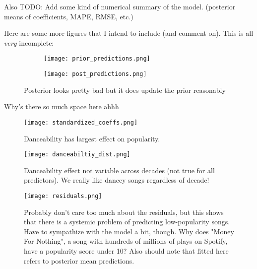 \documentclass[12pt, twoside]{article}
\begin{document}
Also TODO: Add some kind of numerical summary of the model. (posterior means of coefficients, MAPE, RMSE, etc.)

Here are some more figures that I intend to include (and comment on). This is all \textit{very} incomplete:

\begin{figure}[H]
\begin{subfigure}[b]{0.5\textwidth}
\centering
\texttt{[image: prior\_predictions.png]}
\caption{}
\label{fig:prior}
\end{subfigure}
\begin{subfigure}[b]{0.5\textwidth}
\centering
\texttt{[image: post\_predictions.png]}
\caption{}
\label{fig:post}
\end{subfigure}
\caption{Posterior looks pretty bad but it does update the prior reasonably}
\end{figure}
Why's there so much space here ahhh
\begin{figure}[H] %
\centering
\texttt{[image: standardized\_coeffs.png]} %
\caption{Danceability has largest effect on popularity.}
\label{fig:standardized_coefs} %
\end{figure}

\begin{figure}[H] %
\centering
\texttt{[image: danceabiltiy\_dist.png]} %
\caption{Danceability effect not variable across decades (not true for all predictors). We really like dancey songs regardless of decade!}
\label{fig:danceability_dist} %
\end{figure}

\begin{figure}[H] %
\centering
\texttt{[image: residuals.png]} %
\caption{Probably don't care too much about the residuals, but this shows that there is a systemic problem of predicting low-popularity songs. Have to sympathize with the model a bit, though. Why does "Money For Nothing", a song with hundreds of millions of plays on Spotify, have a popularity score under 10? Also should note that fitted here refers to posterior mean predictions.}
\label{fig:residuals} %
\end{figure}
\end{document}
